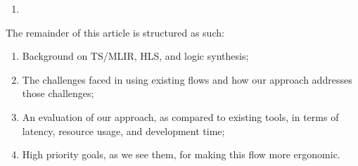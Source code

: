 \begin{enumerate}
	\item
\end{enumerate}
The remainder of this article is structured as such:
\begin{enumerate}
	\item Background on TS/MLIR, HLS, and logic synthesis;
	\item The challenges faced in using existing flows and how our approach addresses those challenges;
	\item An evaluation of our approach, as compared to existing tools, in terms of latency, resource usage, and development time;
	\item High priority goals, as we see them, for making this flow more ergonomic.
\end{enumerate}


